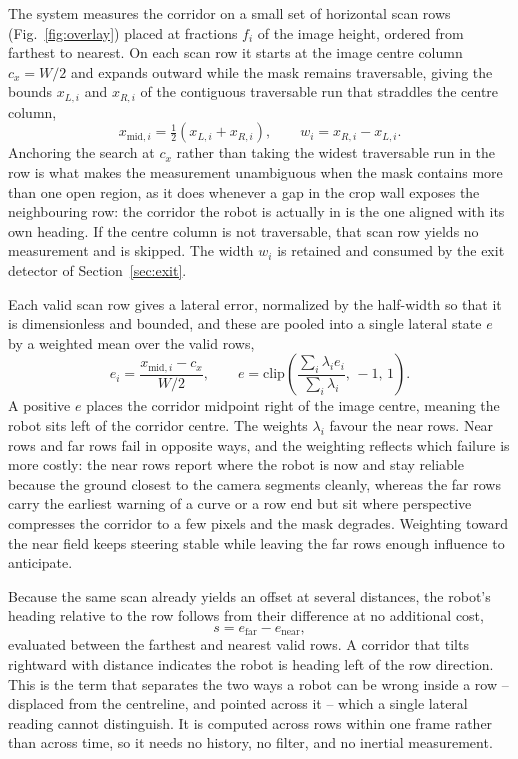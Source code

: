 \documentclass[conference]{IEEEtran}
\begin{document}
The system measures the corridor on a small set of horizontal scan rows
(Fig.~\ref{fig:overlay}) placed
at fractions $f_i$ of the image height, ordered from farthest to nearest. On
each scan row it starts at the image centre column $c_x = W/2$ and expands
outward while the mask remains traversable, giving the bounds $x_{L,i}$ and
$x_{R,i}$ of the contiguous traversable run that straddles the centre column,
\begin{equation}
\label{eq:midpoint}
x_{\mathrm{mid},i} = \tfrac{1}{2}\left(x_{L,i} + x_{R,i}\right),
\qquad
w_i = x_{R,i} - x_{L,i} .
\end{equation}
Anchoring the search at $c_x$ rather than taking the widest traversable run in
the row is what makes the measurement unambiguous when the mask contains more
than one open region, as it does whenever a gap in the crop wall exposes the
neighbouring row: the corridor the robot is actually in is the one aligned
with its own heading. If the centre column is not traversable, that scan row
yields no measurement and is skipped. The width $w_i$ is retained and consumed
by the exit detector of Section~\ref{sec:exit}.

Each valid scan row gives a lateral error, normalized by the half-width so
that it is dimensionless and bounded, and these are pooled into a single
lateral state $e$ by a weighted mean over the valid rows,
\begin{equation}
\label{eq:offset}
e_i = \frac{x_{\mathrm{mid},i} - c_x}{W/2},
\qquad
e = \mathrm{clip}\!\left(\frac{\sum_i \lambda_i e_i}{\sum_i \lambda_i},\, -1,\, 1\right).
\end{equation}
A positive $e$ places the corridor midpoint right of the image centre, meaning
the robot sits left of the corridor centre. The weights $\lambda_i$ favour the
near rows. Near rows and far rows fail in opposite ways, and the weighting
reflects which failure is more costly: the near rows report where the robot is
now and stay reliable because the ground closest to the camera segments
cleanly, whereas the far rows carry the earliest warning of a curve or a row
end but sit where perspective compresses the corridor to a few pixels and the
mask degrades. Weighting toward the near field keeps steering stable while
leaving the far rows enough influence to anticipate.

Because the same scan already yields an offset at several distances, the
robot's heading relative to the row follows from their difference at no
additional cost,
\begin{equation}
\label{eq:slope}
s = e_{\mathrm{far}} - e_{\mathrm{near}},
\end{equation}
evaluated between the farthest and nearest valid rows. A corridor that tilts
rightward with distance indicates the robot is heading left of the row
direction. This is the term that separates the two ways a robot can be wrong
inside a row -- displaced from the centreline, and pointed across it -- which
a single lateral reading cannot distinguish. It is computed across rows within
one frame rather than across time, so it needs no history, no filter, and no
inertial measurement.
\end{document}
